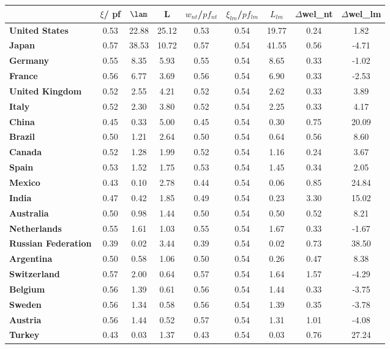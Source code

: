 \begin{small}\begin{tabular}{|l|c|c|c|c|c|c|c|c|}
\hline
&\textbf{$\xi$/ pf}&\textbf{$\lam$}&\textbf{L}&\textbf{$w_{nt}$/$pf_{nt}$}&\textbf{$\xi_{lm}$/$pf_{lm}$}&\textbf{$L_{lm}$}&\textbf{$\Delta$wel\_nt}&\textbf{$\Delta$wel\_lm}\\\hline
\textbf{United States}&0.53&22.88&25.12&0.53&0.54&19.77&0.24&1.82\\\hline
\textbf{Japan}&0.57&38.53&10.72&0.57&0.54&41.55&0.56&-4.71\\\hline
\textbf{Germany}&0.55&8.35&5.93&0.55&0.54&8.65&0.33&-1.02\\\hline
\textbf{France}&0.56&6.77&3.69&0.56&0.54&6.90&0.33&-2.53\\\hline
\textbf{United Kingdom}&0.52&2.55&4.21&0.52&0.54&2.62&0.33&3.89\\\hline
\textbf{Italy}&0.52&2.30&3.80&0.52&0.54&2.25&0.33&4.17\\\hline
\textbf{China}&0.45&0.33&5.00&0.45&0.54&0.30&0.75&20.09\\\hline
\textbf{Brazil}&0.50&1.21&2.64&0.50&0.54&0.64&0.56&8.60\\\hline
\textbf{Canada}&0.52&1.28&1.99&0.52&0.54&1.16&0.24&3.67\\\hline
\textbf{Spain}&0.53&1.52&1.75&0.53&0.54&1.45&0.34&2.05\\\hline
\textbf{Mexico}&0.43&0.10&2.78&0.44&0.54&0.06&0.85&24.84\\\hline
\textbf{India}&0.47&0.42&1.85&0.49&0.54&0.23&3.30&15.02\\\hline
\textbf{Australia}&0.50&0.98&1.44&0.50&0.54&0.50&0.52&8.21\\\hline
\textbf{Netherlands}&0.55&1.61&1.03&0.55&0.54&1.67&0.33&-1.67\\\hline
\textbf{Russian Federation}&0.39&0.02&3.44&0.39&0.54&0.02&0.73&38.50\\\hline
\textbf{Argentina}&0.50&0.58&1.06&0.50&0.54&0.26&0.47&8.38\\\hline
\textbf{Switzerland}&0.57&2.00&0.64&0.57&0.54&1.64&1.57&-4.29\\\hline
\textbf{Belgium}&0.56&1.39&0.61&0.56&0.54&1.44&0.33&-3.75\\\hline
\textbf{Sweden}&0.56&1.34&0.58&0.56&0.54&1.39&0.35&-3.78\\\hline
\textbf{Austria}&0.56&1.44&0.52&0.57&0.54&1.31&1.01&-4.08\\\hline
\textbf{Turkey}&0.43&0.03&1.37&0.43&0.54&0.03&0.76&27.24\\\hline

\end{tabular}
\end{small}
